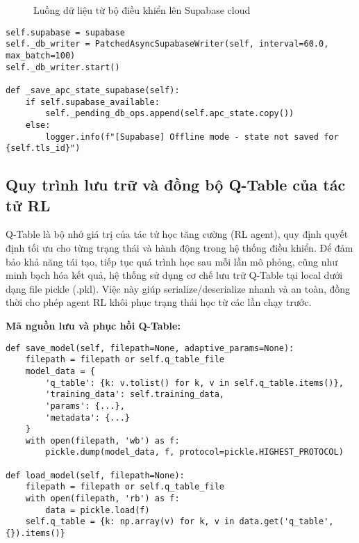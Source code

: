 \begin{figure}[H]
    \centering
    \caption{Luồng dữ liệu từ bộ điều khiển lên Supabase cloud}
\end{figure}

\begin{lstlisting}[style=py,caption={Khởi tạo writer, buffer, batch và retry khi ghi trạng thái lên Supabase}]
self.supabase = supabase
self._db_writer = PatchedAsyncSupabaseWriter(self, interval=60.0, max_batch=100)
self._db_writer.start()

def _save_apc_state_supabase(self):
    if self.supabase_available:
        self._pending_db_ops.append(self.apc_state.copy())
    else:
        logger.info(f"[Supabase] Offline mode - state not saved for {self.tls_id}")
\end{lstlisting}

\subsection{Quy trình lưu trữ và đồng bộ Q-Table của tác tử RL}

Q-Table là bộ nhớ giá trị của tác tử học tăng cường (RL agent), quy định quyết định tối ưu cho từng trạng thái và hành động trong hệ thống điều khiển. Để đảm bảo khả năng tái tạo, tiếp tục quá trình học sau mỗi lần mô phỏng, cũng như minh bạch hóa kết quả, hệ thống sử dụng cơ chế lưu trữ Q-Table tại local dưới dạng file pickle (.pkl). Việc này giúp serialize/deserialize nhanh và an toàn, đồng thời cho phép agent RL khôi phục trạng thái học từ các lần chạy trước.

\textbf{Mã nguồn lưu và phục hồi Q-Table:}
\begin{lstlisting}[style=py,caption={Lưu và phục hồi Q-Table bằng pickle}]
def save_model(self, filepath=None, adaptive_params=None):
    filepath = filepath or self.q_table_file
    model_data = {
        'q_table': {k: v.tolist() for k, v in self.q_table.items()},
        'training_data': self.training_data,
        'params': {...},
        'metadata': {...}
    }
    with open(filepath, 'wb') as f:
        pickle.dump(model_data, f, protocol=pickle.HIGHEST_PROTOCOL)

def load_model(self, filepath=None):
    filepath = filepath or self.q_table_file
    with open(filepath, 'rb') as f:
        data = pickle.load(f)
    self.q_table = {k: np.array(v) for k, v in data.get('q_table', {}).items()}
\end{lstlisting}

